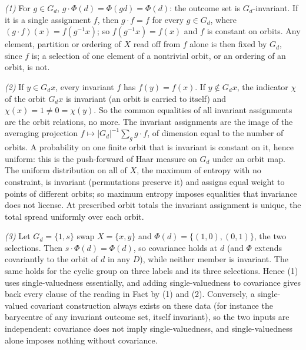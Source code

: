 \emph{(1)} For $g \in G_d$, $g\cdot\Phi(d) = \Phi(gd) = \Phi(d)$: the outcome set is $G_d$-invariant. If it is a single assignment $f$, then $g \cdot f = f$ for every $g \in G_d$, where $(g\cdot f)(x) = f(g^{-1}x)$; so $f(g^{-1}x) = f(x)$ and $f$ is constant on orbits. Any element, partition or ordering of $X$ read off from $f$ alone is then fixed by $G_d$, since $f$ is; a selection of one element of a nontrivial orbit, or an ordering of an orbit, is not.

\emph{(2)} If $y \in G_d x$, every invariant $f$ has $f(y) = f(x)$. If $y \notin G_d x$, the indicator $\chi$ of the orbit $G_d x$ is invariant (an orbit is carried to itself) and $\chi(x) = 1 \neq 0 = \chi(y)$. So the common equalities of all invariant assignments are the orbit relations, no more. The invariant assignments are the image of the averaging projection $f \mapsto |G_d|^{-1}\sum_g g\cdot f$, of dimension equal to the number of orbits. A probability on one finite orbit that is invariant is constant on it, hence uniform: this is the push-forward of Haar measure on $G_d$ under an orbit map. The uniform distribution on all of $X$, the maximum of entropy with no constraint, is invariant (permutations preserve it) and assigns equal weight to points of different orbits; so maximum entropy imposes equalities that invariance does not license. At prescribed orbit totals the invariant assignment is unique, the total spread uniformly over each orbit.

\emph{(3)} Let $G_d = \{1, s\}$ swap $X = \{x, y\}$ and $\Phi(d) = \{(1,0), (0,1)\}$, the two selections. Then $s \cdot \Phi(d) = \Phi(d)$, so covariance holds at $d$ (and $\Phi$ extends covariantly to the orbit of $d$ in any $D$), while neither member is invariant. The same holds for the cyclic group on three labels and its three selections. Hence (1) uses single-valuedness essentially, and adding single-valuedness to covariance gives back every clause of the reading in Fact  by (1) and (2). Conversely, a single-valued covariant construction always exists on these data (for instance the barycentre of any invariant outcome set, itself invariant), so the two inputs are independent: covariance does not imply single-valuedness, and single-valuedness alone imposes nothing without covariance.

